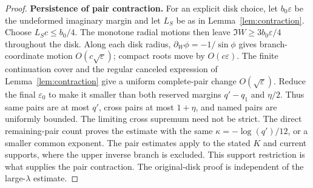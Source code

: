 \documentclass[11pt]{article}
\numberwithin{equation}{section}
\theoremstyle{definition}
\newcommand{\eps}{\varepsilon}
\begin{document}
\begin{proof}
\par\smallskip\noindent\textbf{Persistence of pair contraction.} For an explicit disk choice, let \(b_0\eps\) be the
undeformed imaginary margin and let \(L_S\) be as in
Lemma~\ref{lem:contraction}. Choose \(L_Sc\le b_0/4\).
The monotone radial motions then leave \(\Im W\ge3b_0\eps/4\)
throughout the disk. Along each disk radius,
\(\partial_W\phi=-1/\sin\phi\) gives branch-coordinate motion
\(O(c\sqrt\eps)\); compact roots move by \(O(c\eps)\).
The finite continuation cover and the regular canceled expression
of Lemma~\ref{lem:contraction} give a uniform complete-pair change
\(O(\sqrt\eps)\). Reduce the final \(\eps_0\) to make it
smaller than both reserved margins \(q'-q_1\) and \(\eta/2\).
Thus same pairs are at most \(q'\), cross pairs at most
\(1+\eta\), and named pairs are uniformly bounded.
The limiting cross supremum need not be strict. The direct
remaining-pair count proves the estimate with the same
\(\kappa=-\log(q')/12\), or a smaller common exponent.
The pair estimates apply to the stated \(K\) and current supports,
where the upper inverse branch is excluded. This support restriction
is what supplies the pair contraction. The original-disk proof is
independent of the large-\(\lambda\) estimate.
\end{proof}
\end{document}
